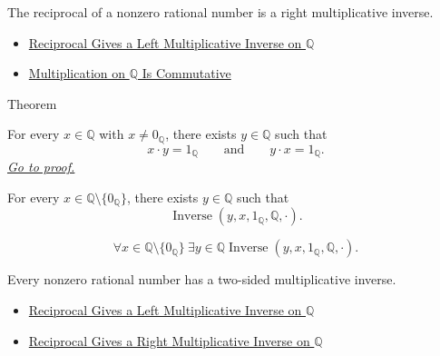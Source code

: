 \begin{remark*}[Interpretation]
The reciprocal of a nonzero rational number is a right multiplicative inverse.
\end{remark*}

\begin{dependencies}
\begin{itemize}
  \item \hyperref[thm:reciprocal-left-multiplicative-inverse-on-q]{Reciprocal Gives a Left Multiplicative Inverse on $\mathbb{Q}$}
  \item \hyperref[thm:multiplication-on-q-commutative]{Multiplication on $\mathbb{Q}$ Is Commutative}
\end{itemize}
\end{dependencies}

\begin{theorembox}{Theorem}
\begin{theorem}
\label{thm:every-nonzero-rational-has-multiplicative-inverse}
For every $x\in\mathbb{Q}$ with $x\ne 0_{\mathbb{Q}}$, there exists
$y\in\mathbb{Q}$ such that
\[
x\cdot y=1_{\mathbb{Q}}
\qquad\text{and}\qquad
y\cdot x=1_{\mathbb{Q}}.
\]
\hyperref[prf:every-nonzero-rational-has-multiplicative-inverse]{\textit{Go to proof.}}
\end{theorem}
\end{theorembox}

\begin{remark*}
For every $x\in\mathbb{Q}\setminus\{0_{\mathbb{Q}}\}$, there exists
$y\in\mathbb{Q}$ such that
\[
\operatorname{Inverse}(y,x,1_{\mathbb{Q}},\mathbb{Q},\cdot).
\]
\end{remark*}

\begin{remark*}
\[
\forall x\in\mathbb{Q}\setminus\{0_{\mathbb{Q}}\}\ \exists y\in\mathbb{Q}
\operatorname{Inverse}(y,x,1_{\mathbb{Q}},\mathbb{Q},\cdot).
\]
\end{remark*}

\begin{remark*}[Interpretation]
Every nonzero rational number has a two-sided multiplicative inverse.
\end{remark*}

\begin{dependencies}
\begin{itemize}
  \item \hyperref[thm:reciprocal-left-multiplicative-inverse-on-q]{Reciprocal Gives a Left Multiplicative Inverse on $\mathbb{Q}$}
  \item \hyperref[cor:reciprocal-right-multiplicative-inverse-on-q]{Reciprocal Gives a Right Multiplicative Inverse on $\mathbb{Q}$}
\end{itemize}
\end{dependencies}

